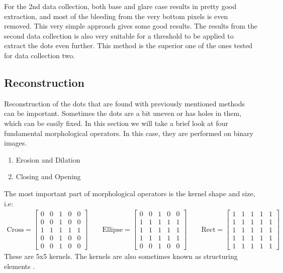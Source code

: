 For the 2nd data collection, both base and glare case results in pretty good extraction, and most of the bleeding from the very bottom pixels is even removed. This very simple approach gives some good results. The results from the second data collection is also very suitable for a threshold to be applied to extract the dots even further. This method is the superior one of the ones tested for data collection two. 









\clearpage




\subsection{Reconstruction}
Reconstruction of the dots that are found with previously mentioned methods can be important. Sometimes the dots are a bit uneven or has holes in them, which can be easily fixed. In this section we will take a brief look at four fundamental morphological operators. In this case, they are performed on binary images. 
\begin{enumerate}
	\item Erosion and Dilation
	\item Closing and Opening
\end{enumerate}

The most important part of morphological operators is the kernel shape and size, i.e:
\begin{align*}
	\textrm{Cross} = \begin{bmatrix} 0 & 0 & 1 & 0 & 0 \\ 0 & 0 & 1 & 0 & 0 \\  1 & 1 & 1 & 1 & 1 \\  0 & 0 & 1 & 0 & 0 \\  0 & 0 & 1 & 0 & 0 \end{bmatrix} \qquad
	\textrm{Ellipse} = \begin{bmatrix} 0 & 0 & 1 & 0 & 0 \\ 1 & 1 & 1 & 1 & 1 \\  1 & 1 & 1 & 1 & 1 \\  1 & 1 & 1 & 1 & 1 \\  0 & 0 & 1 & 0 & 0 \end{bmatrix} \qquad
	\textrm{Rect} = \begin{bmatrix} 1 & 1 & 1 & 1 & 1 \\ 1 & 1 & 1 & 1 & 1 \\  1 & 1 & 1 & 1 & 1 \\  1 & 1 & 1 & 1 & 1 \\  1 & 1 & 1 & 1 & 1 \end{bmatrix}
\end{align*}
These are 5x5 kernels. The kernels are also sometimes known as structuring elements \cite{gonzalez2018digitalChapter9}. 


